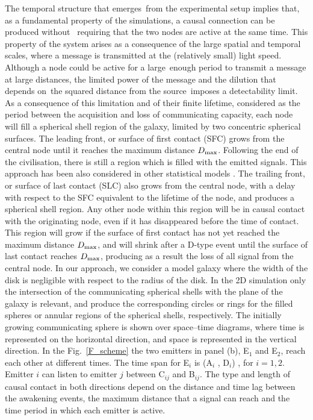 \documentclass[crop]{CSLB}
\newcommand{\ceti}{node}
\begin{document}
The temporal structure that emerges from the experimental setup
implies that, as a fundamental property of the simulations, a causal
connection can be produced without  requiring that the two nodes are
active at the same time.
%
This property of the system arises as a consequence of the large
spatial and temporal scales, where a message is transmitted at the
(relatively small) light speed.
%
Although a \ceti{} could be active for a large enough period to
transmit a message at large distances, the limited power of the
message and the dilution that depends on the squared distance from the
source imposes a detectability limit.
%
As a consequence of this limitation and of their finite lifetime,
considered as the period between the acquisition and loss of
communicating capacity, each \ceti{} will fill a spherical shell
region of the galaxy, limited by two concentric spherical surfaces.
%
The leading front, or surface of first contact (SFC) grows from the
central \ceti{} until it reaches the maximum distance $D_{\rm max}$.
%
Following the end of the civilisation, there is still a region which
is filled with the emitted signals.
%
This approach has been also considered in other statistical models
\citep[e.g., ][]{smith_broadcasting_2009, grimaldi_signal_2017,
Grimaldi2018}.
%
The trailing front, or surface of last contact (SLC) also grows from
the central \ceti{}, with a delay with respect to the SFC equivalent
to the lifetime of the node, and produces a spherical shell region.
%
Any other \ceti{} within this region will be in causal contact with
the originating node, even if it has disappeared before the time of
contact.
%
This region will grow if the surface of first contact has not yet
reached the maximum distance $D_{\rm max}$, and will shrink after a
D-type event until the surface of last contact reaches $D_{\rm max}$,
producing as a result the loss of all signal from the central \ceti{}.
%
In our approach, we consider a model galaxy where the width of the
disk is negligible with respect to the radius of the disk.
%
In the 2D simulation only the intersection of the communicating
spherical shells with the plane of the galaxy is relevant, and produce
the corresponding circles or rings for the filled spheres or annular
regions of the spherical shells, respectively.
%
The initially growing communicating sphere is shown over space--time
diagrams, where time is represented on the horizontal direction, and
space is represented in the vertical direction.
%
In the Fig.~\ref{F_scheme} the two emitters in panel (b), E$_1$ and
E$_2$, reach each other at different times.
%
The time span for E$_i$ is (A$_i$ , D$_i$) , for $i = {1, 2}$.
%
Emitter $i$ can listen to emitter $j$ between C$_{ij}$ and B$_{ij}$.
%
The type and length of causal contact in both directions depend on the
distance and time lag between the awakening events, the maximum
distance that a signal can reach and the time period in which each
emitter is active.
\end{document}
